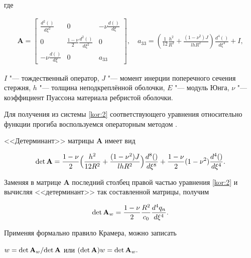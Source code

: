 где

\begin{gather*}

\textbf{A}=\left[\begin{array}{ccc}

                    \displaystyle\frac{d^2()}{d\xi^2} & 0 & -\nu\displaystyle\frac{d()}{d\xi} \\

                    0 & \displaystyle\frac{1-\nu}{2}\frac{d^2()}{d\xi^2} & 0 \\

                    -\nu\displaystyle\frac{d()}{d\xi} & 0 & a_{33}

                \end{array}\right],

\quad 

a_{33}=\left(\displaystyle \frac{1}{12}\frac{h^2}{R^2}+\frac{(1-\nu^2)J}{lhR^2}\right)\frac{d^4()}{d\xi^4}+I,

\end{gather*}

$I$ "--- тождественный оператор, $J$ "--- момент инерции поперечного сечения стержня, $h$ "--- толщина неподкреплённой оболочки, $E$ "--- модуль Юнга, $\nu$ "--- коэффициент Пуассона материала ребристой оболочки.



Для получения из системы \eqref{kor:2} соответствующего уравнения относительно функции прогиба воспользуемся операторным методом \cite{kor:bib:4}.



<<Детерминант>> матрицы $\textbf{A}$ имеет вид

$$\mathop{\rm det}\textbf{A}=\displaystyle\frac{1-\nu}{2}

\Bigl(\frac{h^2}{12R^2}+\frac{(1-\nu^2)J}{lhR^2}\Bigr)

\frac{d^8()}{d\xi^8}+\frac{1-\nu}{2}(1-\nu^2)\frac{d^4()}{d\xi^4}.$$



Заменяя в матрице $\textbf{A}$ последний столбец правой частью уравнения \eqref{kor:2} и вычисляя <<детерминант>> так составленной матрицы, получим

$$\mathop{\rm det}\textbf{A}_w=\displaystyle\frac{1-\nu}{2}\frac{R^2}{c_0}\frac{d^4 q_n}{d\xi^4}. $$

Применяя формально правило Крамера, можно записать 

$w={\mathop{\rm det}\textbf{A}_w}/{\mathop{\rm det}\textbf{A}}$ или $(\mathop{\rm det} \textbf{A})w= \mathop{\rm det}\textbf{A}_w.$

